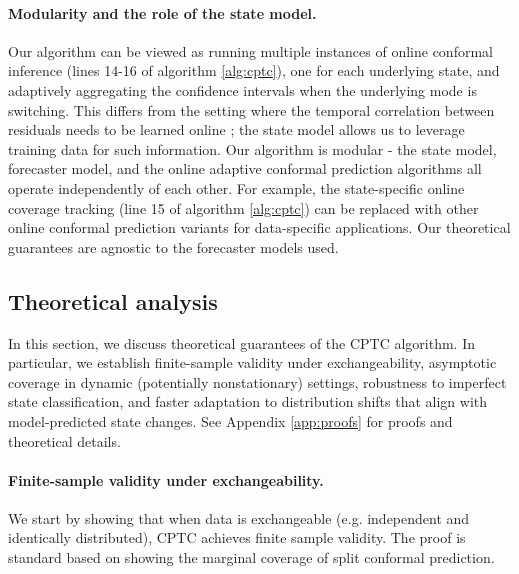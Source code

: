 \paragraph{Modularity and the role of the state model.} Our algorithm can be viewed as running multiple instances of online conformal inference (lines 14-16 of algorithm \ref{alg:cptc}), one for each underlying state, and adaptively aggregating the confidence intervals when the underlying mode is switching. This differs from the setting where the temporal correlation between residuals needs to be learned online \citep{gibbs2024conformal, bastani2022practical, xu2023sequential, auer2023hopcpt}; the state model allows us to leverage training data for such information. Our algorithm is modular - the state model, forecaster model, and the online adaptive conformal prediction algorithms all operate independently of each other. For example, the state-specific online coverage tracking (line 15 of algorithm \ref{alg:cptc}) can be replaced with other online conformal prediction variants for data-specific applications. Our theoretical guarantees are agnostic to the forecaster models used. %



\subsection{Theoretical analysis}
\label{sec:theory}

In this section, we discuss theoretical guarantees of the CPTC algorithm. In particular, we establish finite-sample validity under exchangeability, asymptotic coverage in dynamic (potentially nonstationary) settings, robustness to imperfect state classification, and faster adaptation to distribution shifts that align with model-predicted state changes. See Appendix \ref{app:proofs} for proofs and theoretical details.

\vspace{-0.5em}
\paragraph{Finite-sample validity under exchangeability.}
We start by showing that when data is exchangeable (e.g. independent and identically distributed), CPTC achieves finite sample validity. The proof is standard based on showing the marginal coverage of split conformal prediction. 


